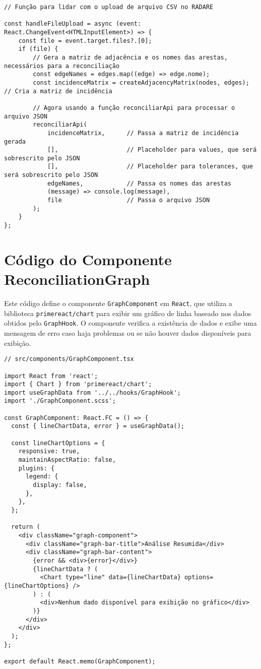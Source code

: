\begin{verbatim}
// Função para lidar com o upload de arquivo CSV no RADARE

const handleFileUpload = async (event: React.ChangeEvent<HTMLInputElement>) => {
    const file = event.target.files?.[0];
    if (file) {
        // Gera a matriz de adjacência e os nomes das arestas, necessários para a reconciliação
        const edgeNames = edges.map((edge) => edge.nome);
        const incidenceMatrix = createAdjacencyMatrix(nodes, edges); // Cria a matriz de incidência
  
        // Agora usando a função reconciliarApi para processar o arquivo JSON
        reconciliarApi(
            incidenceMatrix,      // Passa a matriz de incidência gerada
            [],                   // Placeholder para values, que será sobrescrito pelo JSON
            [],                   // Placeholder para tolerances, que será sobrescrito pelo JSON
            edgeNames,            // Passa os nomes das arestas
            (message) => console.log(message),
            file                  // Passa o arquivo JSON
        );
    }
};
\end{verbatim}


\chapter{Código do Componente ReconciliationGraph}
\label{Anexo:ReconciliationGraph}


Este código define o componente \texttt{GraphComponent} em \texttt{React}, que utiliza a biblioteca \texttt{primereact/chart} para exibir um gráfico de linha baseado nos dados obtidos pelo \texttt{GraphHook}. O componente verifica a existência de dados e exibe uma mensagem de erro caso haja problemas ou se não houver dados disponíveis para exibição.

\begin{verbatim}
// src/components/GraphComponent.tsx

import React from 'react';
import { Chart } from 'primereact/chart';
import useGraphData from '../../hooks/GraphHook';
import './GraphComponent.scss';

const GraphComponent: React.FC = () => {
  const { lineChartData, error } = useGraphData();

  const lineChartOptions = {
    responsive: true,
    maintainAspectRatio: false,
    plugins: {
      legend: {
        display: false,
      },
    },
  };

  return (
    <div className="graph-component">
      <div className="graph-bar-title">Análise Resumida</div>
      <div className="graph-bar-content">
        {error && <div>{error}</div>}
        {lineChartData ? (
          <Chart type="line" data={lineChartData} options={lineChartOptions} />
        ) : (
          <div>Nenhum dado disponível para exibição no gráfico</div>
        )}
      </div>
    </div>
  );
};

export default React.memo(GraphComponent);
\end{verbatim}
